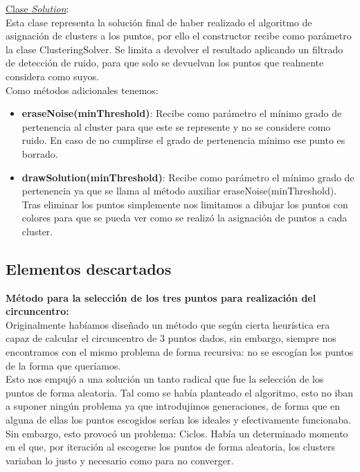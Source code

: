 \documentclass[conference,a4paper]{IEEEtran}
\begin{document}
\newpage
\underline{Clase \textit{Solution}}:\\

Esta clase representa la solución final de haber realizado el algoritmo de asignación de clusters a los puntos, por ello el constructor recibe como parámetro la clase ClusteringSolver. Se limita a devolver el resultado aplicando un filtrado de detección de ruido, para que solo se devuelvan los puntos que realmente considera como suyos.\\

Como métodos adicionales tenemos:\\

\begin{itemize}

	\item{\textbf{eraseNoise(minThreshold)}: Recibe como parámetro el mínimo grado de pertenencia al cluster para que este se represente y no se considere como ruido. En caso de no cumplirse el grado de pertenencia mínimo ese punto es borrado.}\\

	\item{\textbf{drawSolution(minThreshold)}: Recibe como parámetro el mínimo grado de pertenencia ya que se llama al método auxiliar eraseNoise(minThreshold). Tras eliminar los puntos simplemente nos limitamos a dibujar los puntos con colores para que se pueda ver como se realizó la asignación de puntos a cada cluster.}\\

\end{itemize}

\subsection{Elementos descartados}

\textbf{Método para la selección de los tres puntos para realización del circuncentro:} \\

Originalmente habíamos diseñado un método que según cierta heurística era capaz de calcular el circuncentro de 3 puntos dados, sin embargo, siempre nos encontramos con el mismo problema de forma recursiva: no se escogían los puntos de la forma que queríamos.\\

Esto nos empujó a una solución un tanto radical que fue la selección de los puntos de forma aleatoria. Tal como se había planteado el algoritmo, esto no iban a suponer ningún problema ya que introdujimos generaciones, de forma que en alguna de ellas los puntos escogidos serían los ideales y efectivamente funcionaba.
Sin embargo, esto provocó un problema: Ciclos. Había un determinado momento en el que, por iteración al escogerse los puntos de forma aleatoria, los clusters variaban lo justo y necesario como para no converger.\\
\end{document}
